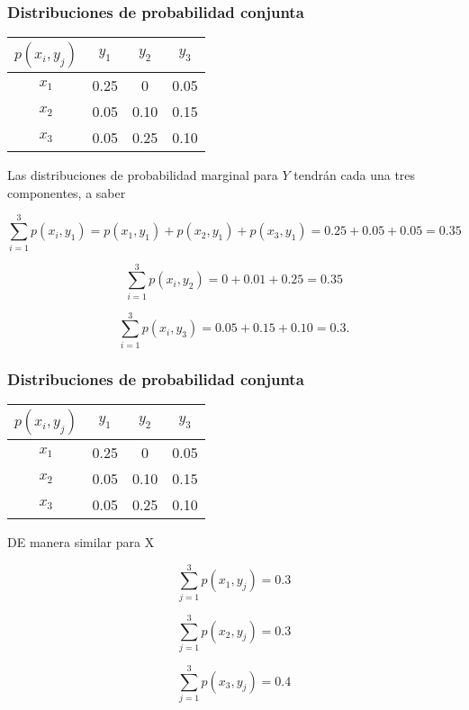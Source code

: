 \documentclass[spanish]{beamer}
\begin{document}
\begin{frame}
\frametitle{Distribuciones de probabilidad conjunta}

\begin{center}
\begin{tabular}{ c c c c } 
\hline
$p(x_{i},y_{j})$ & $y_{1}$ & $y_{2}$ & $y_{3}$\\
 \hline
 $x_{1}$ & 0.25 & 0  & 0.05\\ 
 $x_{2}$ & 0.05 & 0.10 & 0.15\\ 
 $x_{3}$ & 0.05 & 0.25 & 0.10\\ 
 \hline
\end{tabular}
\end{center}

Las distribuciones de probabilidad marginal para $Y$ tendrán cada una tres componentes, a saber


\begin{equation*}
\sum_{i=1}^3 p(x_{i} , y_{1} ) = p(x_{1} , y_{1}) + p(x_{2}, y_{1}) + p(x_{3}, y_{1}) = 0.25 + 0.05 + 0.05 = 0.35
\end{equation*}

\begin{equation*}
\sum_{i=1}^3 p(x_{i} , y_{2} ) = 0+0.01+0.25=0.35
\end{equation*}

\begin{equation*}
\sum_{i=1}^3 p(x_{i} , y_{3} ) = 0.05 + 0.15 + 0.10 = 0.3.
\end{equation*}

\end{frame}

\begin{frame}
\frametitle{Distribuciones de probabilidad conjunta}

\begin{center}
\begin{tabular}{ c c c c } 
\hline
$p(x_{i},y_{j})$ & $y_{1}$ & $y_{2}$ & $y_{3}$\\
 \hline
 $x_{1}$ & 0.25 & 0  & 0.05\\ 
 $x_{2}$ & 0.05 & 0.10 & 0.15\\ 
 $x_{3}$ & 0.05 & 0.25 & 0.10\\ 
 \hline
\end{tabular}
\end{center}

DE manera similar para  X

\begin{equation*}
\sum_{j=1}^3 p(x_{1} , y_{j} ) = 0.3
\end{equation*}

\begin{equation*}
\sum_{j=1}^3 p(x_{2} , y_{j} ) = 0.3
\end{equation*}

\begin{equation*}
\sum_{j=1}^3 p(x_{3} , y_{j} ) = 0.4
\end{equation*}

\end{frame}
\end{document}
